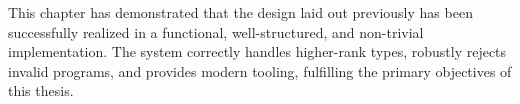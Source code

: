 This chapter has demonstrated that the design laid out previously has been successfully realized in a functional, well-structured, and non-trivial implementation. The system correctly handles higher-rank types, robustly rejects invalid programs, and provides modern tooling, fulfilling the primary objectives of this thesis.